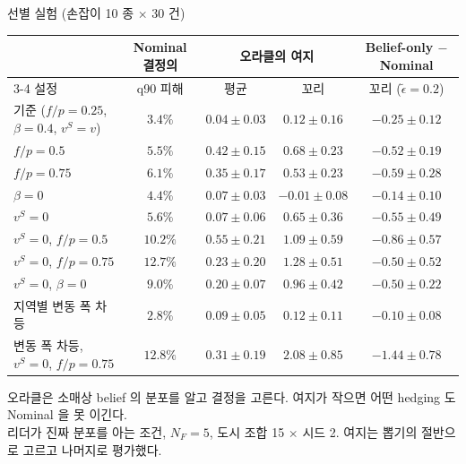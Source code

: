 \documentclass[aspectratio=169,11pt]{beamer}
\newcommand{\teps}{\tilde{\epsilon}}
\begin{document}
\begin{frame}{선별 실험 (손잡이 10 종 $\times$ 30 건)}
\begin{center}
\footnotesize
\begin{tabular}{lcccc}
\toprule
 & Nominal 결정의 & \multicolumn{2}{c}{오라클의 여지} & Belief-only $-$ Nominal\\
\cmidrule(lr){3-4}
설정 & q90 피해 & 평균 & 꼬리 & 꼬리 ($\teps = 0.2$)\\
\midrule
기준 ($f/p = 0.25$, $\beta = 0.4$, $v^{S} = v$) & $3.4\%$ & $0.04 \pm 0.03$ & $0.12 \pm 0.16$ & $-0.25 \pm 0.12$\\
$f/p = 0.5$ & $5.5\%$ & $0.42 \pm 0.15$ & $0.68 \pm 0.23$ & $-0.52 \pm 0.19$\\
$f/p = 0.75$ & $6.1\%$ & $0.35 \pm 0.17$ & $0.53 \pm 0.23$ & $-0.59 \pm 0.28$\\
$\beta = 0$ & $4.4\%$ & $0.07 \pm 0.03$ & $-0.01 \pm 0.08$ & $-0.14 \pm 0.10$\\
$v^{S} = 0$ & $5.6\%$ & $0.07 \pm 0.06$ & $0.65 \pm 0.36$ & $-0.55 \pm 0.49$\\
$v^{S} = 0$, $f/p = 0.5$ & $10.2\%$ & $0.55 \pm 0.21$ & $1.09 \pm 0.59$ & $-0.86 \pm 0.57$\\
$v^{S} = 0$, $f/p = 0.75$ & $12.7\%$ & $0.23 \pm 0.20$ & $1.28 \pm 0.51$ & $-0.50 \pm 0.52$\\
$v^{S} = 0$, $\beta = 0$ & $9.0\%$ & $0.20 \pm 0.07$ & $0.96 \pm 0.42$ & $-0.50 \pm 0.22$\\
지역별 변동 폭 차등 & $2.8\%$ & $0.09 \pm 0.05$ & $0.12 \pm 0.11$ & $-0.10 \pm 0.08$\\
변동 폭 차등, $v^{S} = 0$, $f/p = 0.75$ & $12.8\%$ & $0.31 \pm 0.19$ & $2.08 \pm 0.85$ & $-1.44 \pm 0.78$\\
\bottomrule
\end{tabular}
\end{center}
{\footnotesize 오라클은 소매상 belief 의 분포를 알고 결정을 고른다. 여지가 작으면 어떤 hedging 도 Nominal 을 못 이긴다.\\
리더가 진짜 분포를 아는 조건, $N_F = 5$, 도시 조합 15 $\times$ 시드 2. 여지는 뽑기의 절반으로 고르고 나머지로 평가했다.}
\end{frame}
\end{document}
